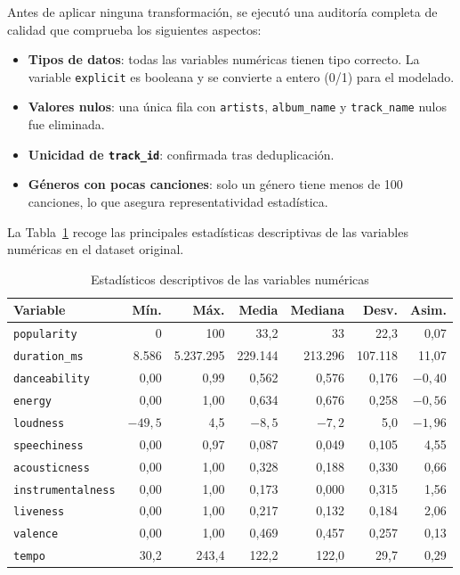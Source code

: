 \documentclass[12pt, a4paper, twoside]{book}
\theoremstyle{definition}
\begin{document}
Antes de aplicar ninguna transformación, se ejecutó una auditoría completa de
calidad que comprueba los siguientes aspectos:

\begin{itemize}
  \item \textbf{Tipos de datos}: todas las variables numéricas tienen tipo correcto.
        La variable \texttt{explicit} es booleana y se convierte a entero (0/1)
        para el modelado.
  \item \textbf{Valores nulos}: una única fila con \texttt{artists},
        \texttt{album\_name} y \texttt{track\_name} nulos fue eliminada.
  \item \textbf{Unicidad de \texttt{track\_id}}: confirmada tras deduplicación.
  \item \textbf{Géneros con pocas canciones}: solo un género tiene menos de 100
        canciones, lo que asegura representatividad estadística.
\end{itemize}

La Tabla~\ref{tab:estadisticos} recoge las principales estadísticas descriptivas
de las variables numéricas en el dataset original.

\begin{table}[H]
\centering
\caption{Estadísticos descriptivos de las variables numéricas}
\label{tab:estadisticos}
\small
{}
\begin{tabular}{lrrrrrr}
\toprule
\textbf{Variable} & \textbf{Mín.} & \textbf{Máx.} & \textbf{Media} &
\textbf{Mediana} & \textbf{Desv.} & \textbf{Asim.} \\
\midrule
\texttt{popularity}       & 0     & 100   & 33,2  & 33    & 22,3  & 0,07  \\
\texttt{duration\_ms}     & 8.586 & 5.237.295 & 229.144 & 213.296 & 107.118 & 11,07 \\
\texttt{danceability}     & 0,00  & 0,99  & 0,562 & 0,576 & 0,176 & $-0,40$ \\
\texttt{energy}           & 0,00  & 1,00  & 0,634 & 0,676 & 0,258 & $-0,56$ \\
\texttt{loudness}         & $-49,5$ & 4,5 & $-8,5$ & $-7,2$ & 5,0  & $-1,96$ \\
\texttt{speechiness}      & 0,00  & 0,97  & 0,087 & 0,049 & 0,105 & 4,55  \\
\texttt{acousticness}     & 0,00  & 1,00  & 0,328 & 0,188 & 0,330 & 0,66  \\
\texttt{instrumentalness} & 0,00  & 1,00  & 0,173 & 0,000 & 0,315 & 1,56  \\
\texttt{liveness}         & 0,00  & 1,00  & 0,217 & 0,132 & 0,184 & 2,06  \\
\texttt{valence}          & 0,00  & 1,00  & 0,469 & 0,457 & 0,257 & 0,13  \\
\texttt{tempo}            & 30,2  & 243,4 & 122,2 & 122,0 & 29,7  & 0,29  \\
\bottomrule
\end{tabular}
\end{table}
\end{document}
